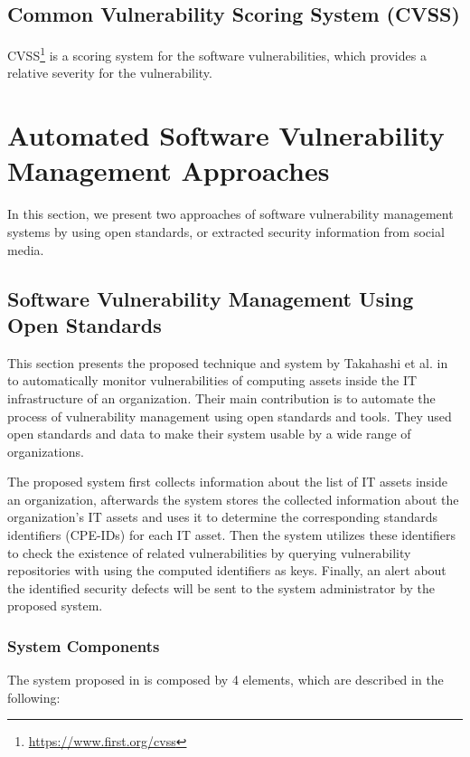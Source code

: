 \documentclass{llncs}
\begin{document}
 \subsection{Common Vulnerability Scoring System (CVSS)}
 CVSS\footnote{\url{https://www.first.org/cvss}} is a scoring system for the software  vulnerabilities, which provides a relative severity for the vulnerability.
 

\section{Automated	Software	Vulnerability	Management	Approaches}
 
 In this section, we present two approaches of software vulnerability management systems by using open standards, or extracted security information from social media.
\subsection{Software	Vulnerability	Management	Using	Open	Standards}

\par This section presents the proposed technique and system by Takahashi et al. in \cite{paper1} to automatically monitor vulnerabilities of computing assets inside the IT infrastructure of an organization. Their main contribution is to automate the process of vulnerability management using open standards and tools. They used open standards and data to make their system usable by a wide range of organizations.
\par
 The proposed system first collects information about the list of IT assets inside an organization, afterwards the system stores the collected information about the organization's IT assets and uses it to determine the corresponding standards identifiers (CPE-IDs) for each IT asset. Then the system utilizes these identifiers to check the existence of related vulnerabilities by querying vulnerability repositories with using the computed identifiers as keys. Finally, an alert about the identified security defects will be sent to the system administrator by the proposed system.
    
\subsubsection {System Components \newline}

\par
 The system proposed in \cite{paper1} is composed by 4 elements, which are described in the following:
\end{document}
